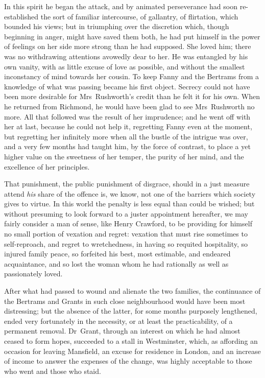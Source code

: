 In this spirit he began the attack, and by animated perseverance had soon re-established the sort of familiar intercourse, of gallantry, of flirtation, which bounded his views; but in triumphing over the discretion which, though beginning in anger, might have saved them both, he had put himself in the power of feelings on her side more strong than he had supposed. She loved him; there was no withdrawing attentions avowedly dear to her. He was entangled by his own vanity, with as little excuse of love as possible, and without the smallest inconstancy of mind towards her cousin. To keep Fanny and the Bertrams from a knowledge of what was passing became his first object. Secrecy could not have been more desirable for Mrs~Rushworth's credit than he felt it for his own. When he returned from Richmond, he would have been glad to see Mrs~Rushworth no more. All that followed was the result of her imprudence; and he went off with her at last, because he could not help it, regretting Fanny even at the moment, but regretting her infinitely more when all the bustle of the intrigue was over, and a very few months had taught him, by the force of contrast, to place a yet higher value on the sweetness of her temper, the purity of her mind, and the excellence of her principles.

That punishment, the public punishment of disgrace, should in a just measure attend \textit{his}  share of the offence is, we know, not one of the barriers which society gives to virtue. In this world the penalty is less equal than could be wished; but without presuming to look forward to a juster appointment hereafter, we may fairly consider a man of sense, like Henry Crawford, to be providing for himself no small portion of vexation and regret: vexation that must rise sometimes to self-reproach, and regret to wretchedness, in having so requited hospitality, so injured family peace, so forfeited his best, most estimable, and endeared acquaintance, and so lost the woman whom he had rationally as well as passionately loved.

After what had passed to wound and alienate the two families, the continuance of the Bertrams and Grants in such close neighbourhood would have been most distressing; but the absence of the latter, for some months purposely lengthened, ended very fortunately in the necessity, or at least the practicability, of a permanent removal. Dr~Grant, through an interest on which he had almost ceased to form hopes, succeeded to a stall in Westminster, which, as affording an occasion for leaving Mansfield, an excuse for residence in London, and an increase of income to answer the expenses of the change, was highly acceptable to those who went and those who staid.

